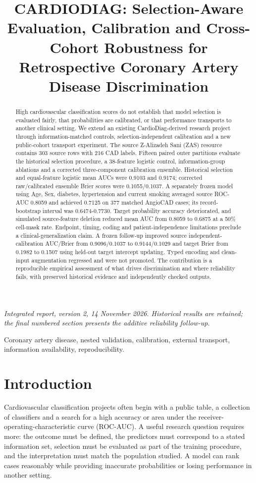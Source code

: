 \documentclass[conference]{IEEEtran}
\title{CARDIODIAG: Selection-Aware Evaluation, Calibration and Cross-Cohort Robustness for Retrospective Coronary Artery Disease Discrimination}
\author{\IEEEauthorblockN{Erukudinnela Akhil Preetham, Chunduri Hari Krishna, G Vennela}\IEEEauthorblockA{Department of Computer Science and Engineering\\Prasad V. Potluri Siddhartha Institute of Technology (PVPSIT)\\Vijayawada, Andhra Pradesh, India\\Project guide: K. Naga Gopi}}
\begin{document}
\pagestyle{plain}
\maketitle
\thispagestyle{plain}
\begin{abstract}
High cardiovascular classification scores do not establish that model selection is evaluated fairly, that probabilities are calibrated, or that performance transports to another clinical setting. We extend an existing CardioDiag-derived research project through information-matched controls, selection-independent calibration and a new public-cohort transport experiment. The source Z-Alizadeh Sani (ZAS) resource contains 303 source rows with 216 CAD labels. Fifteen paired outer partitions evaluate the historical selection procedure, a 38-feature logistic control, information-group ablations and a corrected three-component calibration ensemble. Historical selection and equal-feature logistic mean AUCs were 0.9103 and 0.9174; corrected raw/calibrated ensemble Brier scores were 0.1055/0.1037. A separately frozen model using Age, Sex, diabetes, hypertension and current smoking averaged source ROC-AUC 0.8059 and achieved 0.7125 on 377 matched AngioCAD cases; its record-bootstrap interval was 0.6474-0.7730. Target probability accuracy deteriorated, and simulated source-feature deletion reduced mean AUC from 0.8059 to 0.6875 at a 50\% cell-mask rate. Endpoint, timing, coding and patient-independence limitations preclude a clinical-generalization claim. A frozen follow-up improved source independent-calibration AUC/Brier from 0.9096/0.1037 to 0.9144/0.1029 and target Brier from 0.1982 to 0.1507 using held-out target intercept updating. Typed encoding and clean-input augmentation regressed and were not promoted. The contribution is a reproducible empirical assessment of what drives discrimination and where reliability fails, with preserved historical evidence and independently checked outputs.

\end{abstract}
\noindent\textit{Integrated report, version 2, 14 November 2026. Historical results are retained; the final numbered section presents the additive reliability follow-up.}\par
\begin{IEEEkeywords}
Coronary artery disease, nested validation, calibration, external transport, information availability, reproducibility.

\end{IEEEkeywords}
\section{Introduction}
Cardiovascular classification projects often begin with a public table, a collection of classifiers and a search for a high accuracy or area under the receiver-operating-characteristic curve (ROC-AUC). A useful research question requires more: the outcome must be defined, the predictors must correspond to a stated information set, selection must be evaluated as part of the training procedure, and the interpretation must match the population studied. A model can rank cases reasonably while providing inaccurate probabilities or losing performance in another setting.
\end{document}
